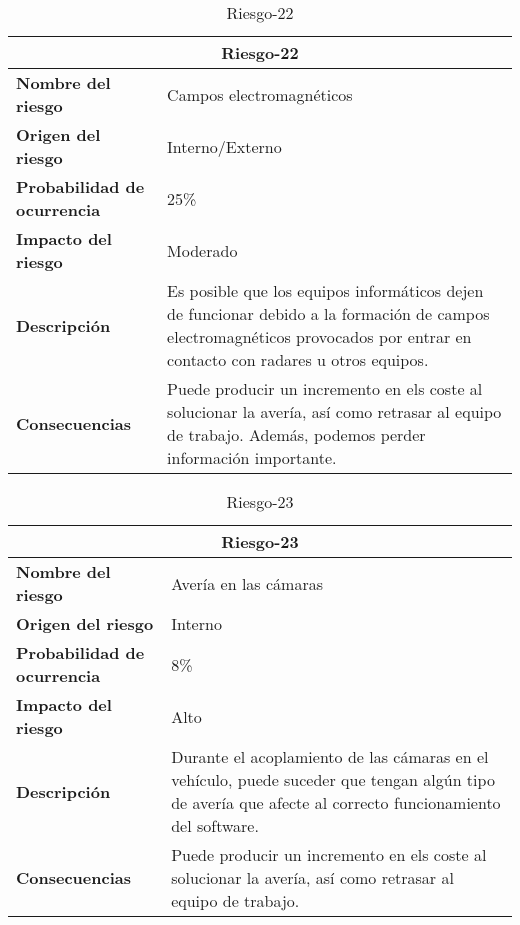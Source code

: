 \begin{table}[H]
\begin{center}
\begin{tabular}{p{} p{7cm}}
\multicolumn{2}{c}{\textbf{Riesgo-22} } \\
\hline \hline
\textbf{Nombre del riesgo} & Campos electromagnéticos  \\
\hline
\textbf{Origen del riesgo} & Interno/Externo\\
\hline
\textbf{Probabilidad de ocurrencia} &  25\% \\
\hline
\textbf{Impacto del riesgo} &  Moderado \\
\hline
\textbf{Descripción} & Es posible que los equipos informáticos dejen de funcionar debido a la formación de campos electromagnéticos provocados por entrar en contacto con radares u otros equipos.   \\
\hline
\textbf{Consecuencias} &  Puede producir un incremento en els coste al solucionar la avería, así como retrasar al equipo de trabajo. Además, podemos perder información importante.  \\
\hline
\end{tabular}
\caption{Riesgo-22}
\label{tab:Riesgo-22}
\end{center}
\end{table}

\begin{table}[H]
\begin{center}
\begin{tabular}{p{} p{7cm}}
\multicolumn{2}{c}{\textbf{Riesgo-23} } \\
\hline \hline
\textbf{Nombre del riesgo} & Avería en las cámaras \\
\hline
\textbf{Origen del riesgo} & Interno\\
\hline
\textbf{Probabilidad de ocurrencia} & 8\%  \\
\hline
\textbf{Impacto del riesgo} &  Alto \\
\hline
\textbf{Descripción} &  Durante el acoplamiento de las cámaras  en el vehículo, puede suceder que tengan  algún tipo de avería que afecte al correcto funcionamiento del software.  \\
\hline
\textbf{Consecuencias} & Puede producir un incremento en els coste al solucionar la avería, así como retrasar al equipo de trabajo.   \\
\hline
\end{tabular}
\caption{Riesgo-23}
\label{tab:Riesgo-23}
\end{center}
\end{table}

